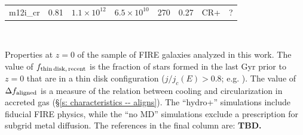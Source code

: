 \documentclass[fleqn,usenatbib]{mnras}
\begin{document}
\begin{table}
\begin{tabular}{cccccccc}
m12i\_cr  &  0.81  & $1.1\times10^{12}$  &  $6.5\times10^{10}$  &  270  &  0.27  &  CR+  &  ?    \\
\end{tabular}
\\
\begin{flushleft}
Properties at $z=0$ of the sample of FIRE galaxies analyzed in this work.
The value of $f_{\rm thin\,disk,\,recent}$ is the fraction of stars formed in the last Gyr prior to $z=0$ that are in a thin disk configuration ($j/j_c(E) > 0.8$; e.g. \citealt{Yu2021}).
The value of $\Delta f_{\rm aligned}$ is a measure of the relation between cooling and circularization in accreted gas (\S\ref{s: characteristics -- aligns}).
The ``hydro+'' simulations include fiducial FIRE physics, while the ``no MD'' simulations exclude a prescription for subgrid metal diffusion.
The references in the final column are:
\textbf{TBD.}
\end{flushleft}
\label{table: simulations_used}
\end{table}

\end{document}

